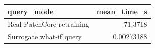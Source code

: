 \begin{tabular}{lr}
\toprule
               query\_mode &  mean\_time\_s \\
\midrule
Real PatchCore retraining &      71.3718 \\
  Surrogate what-if query &   0.00273188 \\
\bottomrule
\end{tabular}
